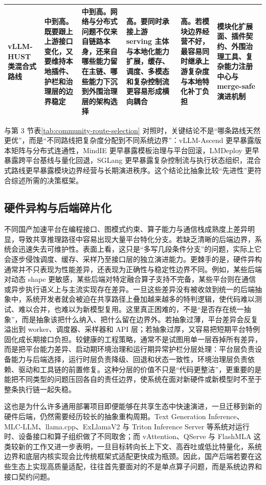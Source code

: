 \begin{table}[t]
\begin{tabularx}{\textwidth}{>{\raggedright\arraybackslash}p{2.1cm}p{2.8cm}p{2.5cm}p{2.8cm}p{2.8cm}X}
vLLM-HUST 类混合式路线 & 中到高。既要跟上上游接口变化，又要维持本地插件、护栏和治理层的边界稳定\citep{vllmhust} & 中到高。网络与分布式问题不仅来自链路本身，还来自哪些能力留在主链、哪些能力下沉到外围治理层的架构选择 & 高。要同时承接上游 serving 主体与本地化能力扩展，缓存、调度、多模态和复杂控制流更容易形成横向耦合 & 高。若模块边界经营不好，最容易同时继承上游复杂度与本地特化补丁负担 & 模块化扩展面、插件契约、外围治理工具、复杂能力注册中心与 merge-safe 演进机制 \\
\bottomrule
\end{tabularx}
\end{table}

与第 3 节表\ref{tab:community-route-selection} 对照时，关键结论不是“哪条路线天然更优”，而是“不同路线把复杂度分配到不同系统边界”：vLLM-Ascend 更早暴露版本矩阵与分布式连通性，MindIE 更早暴露模板治理与平台回滚，LMDeploy 更早暴露跨平台基线与量化回退，SGLang 更早暴露复杂控制流与执行状态组织，混合式路线更早暴露模块边界经营与长期演进秩序。这个结论比抽象比较“先进性”更符合综述所需的决策框架。

\subsection{硬件异构与后端碎片化}

不同国产加速平台在编程接口、图模式约束、算子能力与通信栈成熟度上差异明显，导致共享推理路径中容易出现大量平台特化分支。若缺乏清晰的后端边界，系统会迅速失去可维护性。表面上看，这只是“多写几段条件分支”的问题，实际上它会逐步侵蚀调度、缓存、采样乃至接口层的独立演进能力。更棘手的是，硬件异构通常并不只表现为性能差异，还表现为正确性与稳定性边界不同。例如，某些后端对动态 shape 更敏感，某些后端对特定融合算子支持不完备，某些平台则在通信或异步执行语义上与主流实现存在差异。一旦这些差异没有被收敛到统一的后端抽象中，系统开发者就会被迫在共享路径上叠加越来越多的特判逻辑，使代码难以测试、难以合并，也难以为新模型复用。这里真正困难的，不是“是否存在统一抽象”，而是抽象该把什么纳入、把什么留在边界外。若抽象过薄，平台差异会反复溢出到 worker、调度器、采样器和 API 层；若抽象过厚，又容易把短期平台特例固化成长期接口负担。较健康的工程策略，通常不是试图用单一层吞掉所有差异，而是把平台能力差异、启动期环境治理和运行期异常护栏分层处理：平台层负责设备能力与后端选择，运行时层负责降级、回退和状态一致性，环境治理层负责依赖、驱动和工具链的前置修复。这种分层的价值不只是“代码更整洁”，更重要的是能把不同类型的问题压回各自的责任边界，使系统在面对新硬件或新模型时不至于整条执行链一起失稳。

这也是为什么许多通用部署项目即便能够在共享生态中快速演进，一旦迁移到新的硬件后端，仍然需要经历较长的抽象重构周期。Text Generation Inference、MLC-LLM、llama.cpp、ExLlamaV2 与 Triton Inference Server 等系统对运行时、设备接口和算子组织做了不同取舍\citep{tgi,mlcllm,llamacpp,exllamav2,tritonserver}；而 vAttention、QServe 与 FlashMLA 这类较新的工作又进一步表明，一旦目标转向长上下文、高吞吐或低比特量化，系统边界和底层内核实现会比传统框架式适配更快成为瓶颈\citep{kwon2024vattention,wang2024qserve,deepseekflashmla}。因此，国产后端若要在这些生态上实现高质量适配，往往首先要面对的不是单点算子问题，而是系统边界和接口契约问题。


